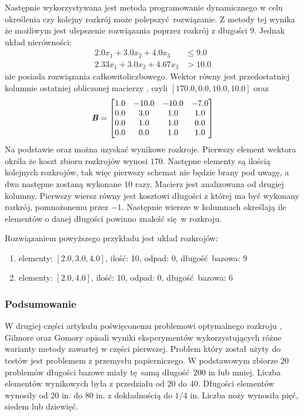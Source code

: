 Następnie wykorzystywana jest metoda programowanie dynamicznego w celu określenia czy kolejny rozkrój może polepszyć rozwiązanie. Z metody tej wynika że możliwym jest ulepszenie rozwiązania poprzez rozkrój z długości 9. Jednak układ nierówności:
\begin{equation*}
  \begin{aligned}
    2.0 x_{1}+ 3.0 x_{2}+ 4.0 x_{3} &\le 9.0 \\
    2.33 x_{1}+ 3.0 x_{2}+ 4.67 x_{3} &> 10.0
  \end{aligned}
\end{equation*}
nie posiada rozwiązania całkowitoliczbowego. Wektor  równy jest przedostatniej kolumnie ostatniej obliczonej macierzy , czyli $[170.0,0.0,10.0,10.0]$ oraz
\begin{equation*}
  \textbf{\textit{B}} =
  \begin{bmatrix}
    1.0 & -10.0 & -10.0 & -7.0 \\
    0.0 & 3.0 & 1.0 & 1.0 \\
    0.0 & 1.0 & 1.0 & 0.0 \\
    0.0 & 0.0 & 1.0 & 1.0
  \end{bmatrix}
\end{equation*}
Na podstawie  oraz  można uzyskać wynikowe rozkroje. Pierwszy element wektora  okrśla że koszt zbioru rozkrojów wynosi $170$. Następne elementy są ilością kolejnych rozkrojów, tak więc pierwszy schemat nie będzie brany pod uwagę, a dwa następne zostaną wykonane $10$ razy. Macierz  jest analizowana od drugiej kolumny. Pierwszy wiersz równy jest kosztowi długości z której ma być wykonany rozkrój, pomnożonemu przez $-1$. Następnie wiersze w kolumnach określają ile elementów o danej długości powinno znaleźć się w rozkroju.

Rozwiązaniem powyższego przykładu jest układ rozkrojów:
\begin{enumerate}
  \item  elementy: $[2.0,3.0,4.0]$, ilość: 10, odpad: 0, długość bazowa: 9
  \item  elementy: $[2.0,4.0]$, ilość: 10, odpad: 0, długość bazowa: 6
\end{enumerate}
\subsubsection{Podsumowanie}
W drugiej części artykułu poświęconemu problemowi optymalnego rozkroju \cite{GilmoreGomoryV2Article}, Gilmore oraz Gomory opisali wyniki eksperymentów wykorzystujących różne warianty metody zawartej w części pierwszej. Problem który został użyty do testów jest problemem z przemysłu papierniczego. W podstawowym zbiorze 20 problemów długości bazowe miały tę samą długość 200 in lub mniej. Liczba elementów wynikowych była z przedziału od 20 do 40. Długości elementów wynosiły od 20 in. do 80 in. z dokładnością do $1/4$ in. Liczba noży wynosiła pięć, siedem lub dziewięć.

